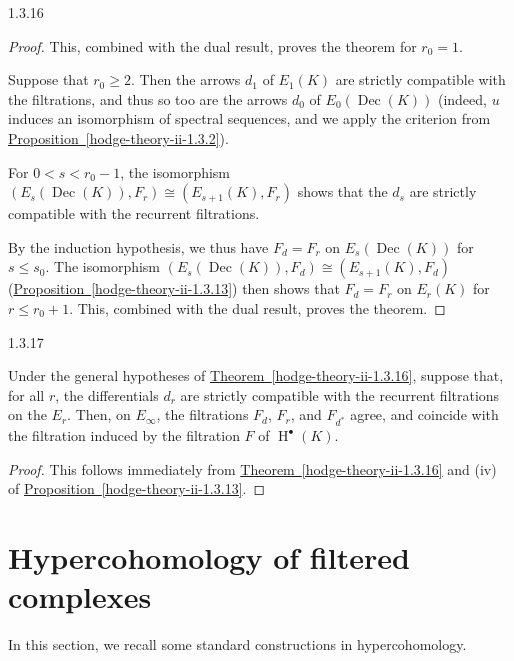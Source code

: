 \begin{theorem}{1.3.16}
\begin{proof}
      This, combined with the dual result, proves the theorem for \(r_0=1\).\par{}Suppose that \(r_0\geqslant 2\).
      Then the arrows \(d_1\) of \(E_1(K)\) are strictly compatible with the filtrations, and thus so too are the arrows \(d_0\) of \(E_0(\operatorname {Dec}(K))\) (indeed, \(u\) induces an isomorphism of spectral sequences, and we apply the criterion from \hyperref[hodge-theory-ii-1.3.2]{Proposition~\ref*{hodge-theory-ii-1.3.2}}).\par{}For \(0<s<r_0-1\), the isomorphism \((E_s(\operatorname {Dec}(K)),F_r)\cong (E_{s+1}(K),F_r)\) shows that the \(d_s\) are strictly compatible with the recurrent filtrations.\par{}By the induction hypothesis, we thus have \(F_d=F_r\) on \(E_s(\operatorname {Dec}(K))\) for \(s\leqslant  s_0\).
      The isomorphism \((E_s(\operatorname {Dec}(K)),F_d)\cong (E_{s+1}(K),F_d)\) (\hyperref[hodge-theory-ii-1.3.13]{Proposition~\ref*{hodge-theory-ii-1.3.13}}) then shows that \(F_d=F_r\) on \(E_r(K)\) for \(r\leqslant  r_0+1\).
      This, combined with the dual result, proves the theorem.\end{proof}\end{theorem}\begin{corollary}{1.3.17}\label{hodge-theory-ii-1.3.17}\skipsinglepar\par{}Under the general hypotheses of \hyperref[hodge-theory-ii-1.3.16]{Theorem~\ref*{hodge-theory-ii-1.3.16}}, suppose that, for all \(r\), the differentials \(d_r\) are strictly compatible with the recurrent filtrations on the \(E_r\).
    Then, on \(E_\infty \), the filtrations \(F_d\), \(F_r\), and \(F_{d^*}\) agree, and coincide with the filtration induced by the filtration \(F\) of \(\operatorname {H}^\bullet (K)\).\begin{proof}\par{}This follows immediately from \hyperref[hodge-theory-ii-1.3.16]{Theorem~\ref*{hodge-theory-ii-1.3.16}} and (iv) of \hyperref[hodge-theory-ii-1.3.13]{Proposition~\ref*{hodge-theory-ii-1.3.13}}.\end{proof}\end{corollary}\section{Hypercohomology of filtered complexes}\label{hodge-theory-ii-1.4}\par{}In this section, we recall some standard constructions in hypercohomology.
